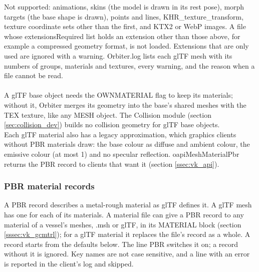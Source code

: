 \documentclass[Orbiter Developer Manual.tex]{subfiles}
\begin{document}
\begin{sloppypar}
\noindent
Not supported: animations, skins (the model is drawn in its rest pose), morph targets (the base shape is drawn), points and lines, KHR\_texture\_transform, texture coordinate sets other than the first, and KTX2 or WebP images. A file whose extensionsRequired list holds an extension other than those above, for example a compressed geometry format, is not loaded. Extensions that are only used are ignored with a warning. Orbiter.log lists each glTF mesh with its numbers of groups, materials and textures, every warning, and the reason when a file cannot be read.\\
\\
A glTF base object needs the OWNMATERIAL flag to keep its materials; without it, Orbiter merges its geometry into the base's shared meshes with the TEX texture, like any MESH object. The Collision module (section \ref{sec:collision_dev}) builds no collision geometry for glTF base objects.\\
Each glTF material also has a legacy approximation, which graphics clients without PBR materials draw: the base colour as diffuse and ambient colour, the emissive colour (at most 1) and no specular reflection. oapiMeshMaterialPbr returns the PBR record to clients that want it (section \ref{ssec:vk_api}).


\subsubsection{PBR material records}
\label{sssec:vk_pbr}
A PBR record describes a metal-rough material as glTF defines it. A glTF mesh has one for each of its materials. A material file can give a PBR record to any material of a vessel's meshes, .msh or glTF, in its MATERIAL block (section \ref{sssec:vk_gcmtrl}); for a glTF material it replaces the file's record as a whole. A record starts from the defaults below. The line PBR switches it on; a record without it is ignored. Key names are not case sensitive, and a line with an error is reported in the client's log and skipped.


\end{sloppypar}
\end{document}

